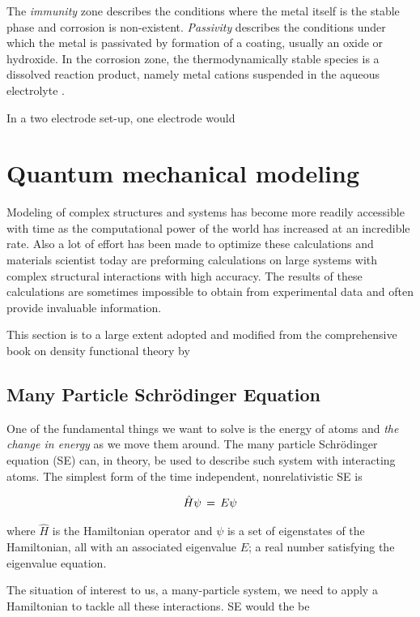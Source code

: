 {{The \textit{immunity} zone describes the conditions where the metal itself is the stable phase and corrosion is non-existent. \textit{Passivity} describes the conditions under which the metal is passivated by formation of a coating, usually an oxide or hydroxide. In the corrosion zone, the thermodynamically stable species is a dissolved reaction product, namely metal cations suspended in the aqueous electrolyte \citep{Beverskog1995}.

In a two electrode set-up, one electrode would 


}
\newpage
\section{Quantum mechanical modeling}

Modeling of complex structures and systems has become more readily accessible with time as the computational power of the world has increased at an incredible rate. Also a lot of effort has been made to optimize these calculations and materials scientist today are preforming calculations on large systems with complex structural interactions with high accuracy. The results of these calculations are sometimes impossible to obtain from experimental data and often provide invaluable information. 

This section is to a large extent adopted and modified from the comprehensive book on density functional theory by \citet{Sholl2009}

\subsection{Many Particle Schrödinger Equation}

One of the fundamental things we want to solve is the energy of atoms and \textit{the change in energy} as we move them around. The many particle Schrödinger equation (SE) can, in theory, be used to describe such system with interacting atoms. The simplest form of the time independent, nonrelativistic SE is

\begin{align}
\hat{H}\psi\,=\, E\psi
	\label{eq:schrödinger_simple}
\end{align}

where $\hat{H}$ is the Hamiltonian operator and $\psi$ is a set of eigenstates of the Hamiltonian, all with an associated eigenvalue $E$; a real number satisfying the eigenvalue equation.

The situation of interest to us, a many-particle system, we need to apply a Hamiltonian to tackle all these interactions. SE would the be

}
